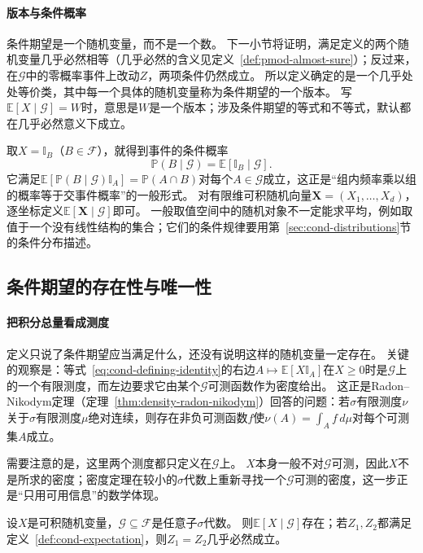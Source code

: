 \paragraph{版本与条件概率}
条件期望是一个随机变量，而不是一个数。
下一小节将证明，满足定义的两个随机变量几乎必然相等（几乎必然的含义见定义~\ref{def:pmod-almost-sure}）；反过来，在$\mathcal G$中的零概率事件上改动$Z$，两项条件仍然成立。
所以定义确定的是一个几乎处处等价类，其中每一个具体的随机变量称为条件期望的一个版本。
写$\mathbb E[X\mid\mathcal G]=W$时，意思是$W$是一个版本；涉及条件期望的等式和不等式，默认都在几乎必然意义下成立。

取$X=\mathbb I_B$（$B\in\mathcal F$），就得到事件的条件概率
\[
  \mathbb P(B\mid\mathcal G)=\mathbb E[\mathbb I_B\mid\mathcal G].
\]
它满足$\mathbb E[\mathbb P(B\mid\mathcal G)\mathbb I_A]=\mathbb P(A\cap B)$对每个$A\in\mathcal G$成立，这正是“组内频率乘以组的概率等于交事件概率”的一般形式。
对有限维可积随机向量$\bm X=(X_1,\ldots,X_d)$，逐坐标定义$\mathbb E[\bm X\mid\mathcal G]$即可。
一般取值空间中的随机对象不一定能求平均，例如取值于一个没有线性结构的集合；它们的条件规律要用第~\ref{sec:cond-distributions}节的条件分布描述。

\subsection{条件期望的存在性与唯一性}

\paragraph{把积分总量看成测度}
定义只说了条件期望应当满足什么，还没有说明这样的随机变量一定存在。
关键的观察是：等式~\eqref{eq:cond-defining-identity}的右边$A\mapsto\mathbb E[X\mathbb I_A]$在$X\geq0$时是$\mathcal G$上的一个有限测度，而左边要求它由某个$\mathcal G$可测函数作为密度给出。
这正是Radon--Nikodym定理（定理~\ref{thm:density-radon-nikodym}）回答的问题：若$\sigma$有限测度$\nu$关于$\sigma$有限测度$\mu$绝对连续，则存在非负可测函数$f$使$\nu(A)=\int_Af\,d\mu$对每个可测集$A$成立。

需要注意的是，这里两个测度都只定义在$\mathcal G$上。
$X$本身一般不对$\mathcal G$可测，因此$X$不是所求的密度；密度定理在较小的$\sigma$代数上重新寻找一个$\mathcal G$可测的密度，这一步正是“只用可用信息”的数学体现。

\begin{theorem}[条件期望的存在性与唯一性]
\label{thm:cond-existence}
设$X$是可积随机变量，$\mathcal G\subseteq\mathcal F$是任意子$\sigma$代数。
则$\mathbb E[X\mid\mathcal G]$存在；若$Z_1,Z_2$都满足定义~\ref{def:cond-expectation}，则$Z_1=Z_2$几乎必然成立。
\end{theorem}

